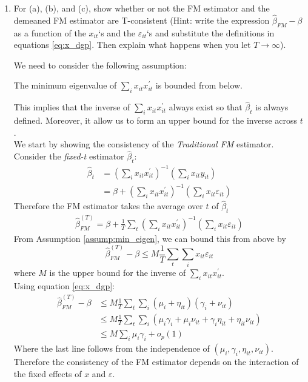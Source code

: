 \documentclass[12pt,twoside]{article}
\begin{document}
\begin{enumerate}[label = (\alph*)]
    \item For (a), (b), and (c), show whether or not the FM estimator and the demeaned FM estimator are T-consistent (Hint: write the expression \(\widehat\beta_{FM}-\beta\) as a function of the \(x_{it}\)`s and the \(\varepsilon_{it}\)`s and substitute the definitions in equations \ref{eq:x_dgp}. Then explain what happens when you let \(T \to \infty\)).
    \begin{solution}
        We need to consider the following assumption:
        \begin{assump}
            \label{assump:min_eigen}
            The minimum eigenvalue of \(\sum_i x_{it}x_{it}^\prime\) is bounded from below.
        \end{assump}
        This implies that the inverse of \(\sum_ix_{it}x_{it}^\prime\) always exist so that \(\widehat\beta_t\) is always defined. Moreover, it allow us to form an upper bound for the inverse across \(t\). \\
        We start by showing the consistency of the \textit{Traditional FM} estimator. Consider the \emph{fixed-t} estimator \(\widehat\beta_t\):
        \begin{align*}
            \widehat\beta_t & = \left(\sum_i x_{it}x_{it}^\prime\right)^{-1}\left(\sum_i x_{it}y_{it}\right) \\
            & = \beta + \left(\sum_i x_{it}x_{it}^\prime\right)^{-1}\left(\sum_i x_{it}\varepsilon_{it}\right)
        \end{align*}
        Therefore the FM estimator takes the average over \(t\) of \(\widehat\beta_t\)
        \begin{align*}
            \widehat\beta^{(T)}_{FM} = \beta + \frac{1}{T}\sum_t\left(\sum_i x_{it}x_{it}^\prime\right)^{-1}\left(\sum_i x_{it}\varepsilon_{it}\right)
        \end{align*}
        From Assumption \ref{assump:min_eigen}, we can bound this from above by
        \[
            \widehat\beta^{(T)}_{FM}-\beta \leq M\frac{1}{T}\sum_t\sum_i x_{it}\varepsilon_{it}
        \]
        where \(M\) is the upper bound for the inverse of \(\sum_i x_{it}x_{it}^\prime\). \\
        Using equation \ref{eq:x_dgp}:
        \begin{align*}
            \label{eq:fm_consistency}
            \widehat\beta^{(T)}_{FM} - \beta & \leq M\frac{1}{T}\sum_t\sum_i \left(\mu_i+\eta_{it}\right)\left(\gamma_i+\nu_{it}\right) \\
            & \leq M\frac{1}{T}\sum_t\sum_i\left(\mu_i\gamma_i + \mu_i\nu_{it} + \gamma_i\eta_{it} + \eta_{it}\nu_{it}\right) \\
            & \leq M\sum_i\mu_i\gamma_i + o_p(1)
        \end{align*}
        Where the last line follows from the independence of \((\mu_i, \gamma_i, \eta_{it}, \nu_{it})\). Therefore the consistency of the FM estimator depends on the interaction of the fixed effects of \(x\) and \(\varepsilon\). 
        

\end{solution}
\end{enumerate}
\end{document}
